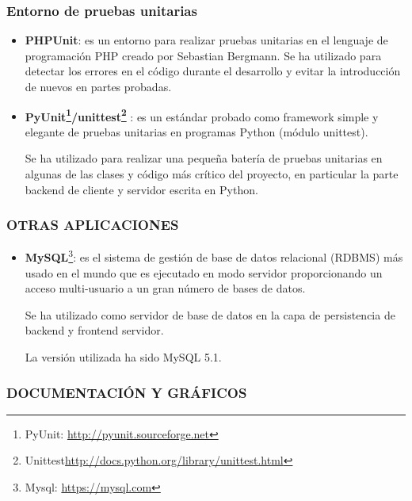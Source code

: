 \subsubsection{Entorno de pruebas unitarias}

\begin{itemize}

\item \textbf{PHPUnit}: es un entorno para realizar pruebas unitarias en
el lenguaje de programación PHP creado por Sebastian Bergmann.
Se ha utilizado para detectar los errores en el código durante el desarrollo
y evitar la introducción de nuevos en partes probadas.

\item \textbf{PyUnit\footnote{PyUnit:
\url{http://pyunit.sourceforge.net}\label{ftn:PyUnit}}/unittest\footnote{Unittest\url{http://docs.python.org/library/unittest.html}\label{ftn:Unittest}}
}: es un estándar
probado como framework simple y elegante de pruebas unitarias en
programas Python (módulo
unittest).

Se ha utilizado para realizar una pequeña batería de pruebas unitarias en
algunas de las clases y código más crítico del proyecto, en particular la
parte backend de cliente y servidor escrita en Python.

\end{itemize}

\subsubsection{\uppercase{Otras aplicaciones}}

\begin{itemize}

\item \textbf{MySQL}\footnote{Mysql:
\url{https://mysql.com}\label{ftn:MySQL}}: es el sistema de gestión de base de
datos relacional (\acs{RDBMS}\label{acro:RDBMS}) más usado en el mundo que es
ejecutado en modo servidor proporcionando un acceso multi-usuario a un gran número de bases
de datos.

Se ha utilizado como servidor de base de datos en
la capa de persistencia de backend y frontend servidor.

La versión utilizada ha sido MySQL 5.1.
\end{itemize}

\newpage

\subsubsection{\uppercase{Documentación y gráficos}}

